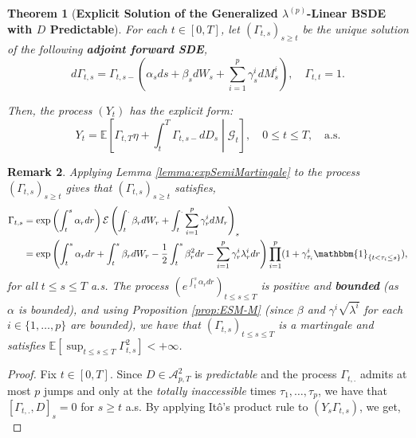 \documentclass[11pt,a4paper]{article}
\numberwithin{equation}{section}
\theoremstyle{newPlain}
\newtheorem{theorem}{Theorem}[section]
\theoremstyle{newDefinition}
\theoremstyle{newRemark}
\newtheorem{remark}[theorem]{Remark}
\begin{document}
{\begin{theorem}[\textbf{Explicit Solution of the Generalized $\lambda^{(p)}$-Linear BSDE with $D$ Predictable}]
    For each $t\in[0,T]$, let $(\Gamma_{t,s})_{s\ge t}$ be the unique solution of the following \textbf{adjoint forward SDE},
    \begin{equation}\label{eq:ThmDpred2}
        d\Gamma_{t,s} = \Gamma_{t,s-}\left(\alpha_sds + \beta_sdW_s + \sum_{i=1}^p\gamma_s^idM_s^i\right),\quad\Gamma_{t,t}=1.
    \end{equation}
    
    Then, the process $(Y_t)$ has the explicit form:
    \begin{equation}\label{eq:ThmDpred3}
        Y_t = \mathbb{E}\left[\Gamma_{t,T}\eta + \int_t^T\Gamma_{t,s-}dD_s\middle|\mathcal{G}_t\right],\quad0\le t\le T,\quad\text{a.s.}
    \end{equation}
\end{theorem}
\begin{remark}\label{remark:thmRR_Dpred}
    Applying Lemma \ref{lemma:expSemiMartingale} to the process $(\Gamma_{t,s})_{s\ge t}$ gives that $(\Gamma_{t,s})_{s\ge t}$ satisfies,
    \begin{align}\label{eq:remarkAdjoint1}
        \begin{aligned}
            \Gamma_{t,s} &= \exp\left(\int_t^s\alpha_rdr\right)\mathcal{E}\left(\int_t^.\beta_rdW_r + \int_t^.\sum_{i=1}^p\gamma_r^idM_r\right)_s\\
            &= \exp\left(\int_t^s\alpha_rdr+\int_t^s\beta_rdW_r - \frac{1}{2}\int_t^s\beta_r^2dr - \sum_{i=1}^p\gamma_r^i\lambda_r^idr\right)\prod_{i=1}^p(1+\gamma_{\tau_i}^i\mathbbm{1}_{\{t<\tau_i\le s\}}),
        \end{aligned}
    \end{align}
    for all $ t \le s\le T$ a.s. The process $(e^{\int_t^s\alpha_rdr})_{t\le s\le T}$ is positive and \textbf{bounded} (as $\alpha$ is bounded), and using Proposition \ref{prop:ESM-M} (since $\beta$ and $\gamma^i\sqrt{\lambda^i}$ for each $i\in\{1,\ldots,p\}$ are bounded), we have that $(\Gamma_{t,s})_{t\le s\le T}$ is a martingale and satisfies $\mathbb{E}[\sup_{t\le s\le T}\Gamma_{t,s}^2]<+\infty$.
\end{remark}
\begin{proof}
    Fix $t\in[0,T]$. Since $D\in\mathcal{A}_{p,T}^2$ is \emph{predictable} and the process $\Gamma_{t,.}$ admits at most $p$ jumps and only at the \emph{totally inaccessible} times $\tau_1,\ldots,\tau_p$, we have that $[\Gamma_{t,.},D]_s=0$ for $s\ge t$ a.s. By applying It\^o's product rule to $(Y_s\Gamma_{t,s})$, we get,
    \begin{equation}\label{eq:proofThmDpred1}

\end{equation}
\end{proof}}
\end{document}
